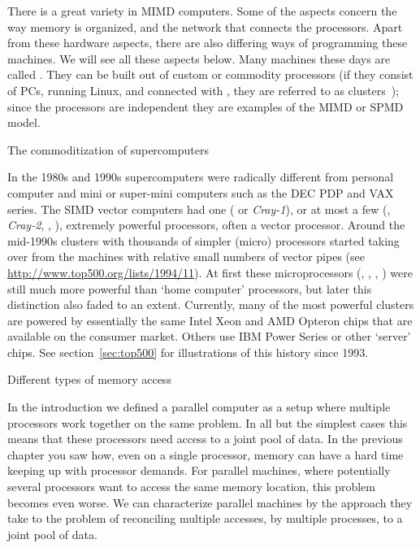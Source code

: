 There is a great variety in \ac{MIMD} computers. Some of the aspects
concern the way memory is organized, and the network that connects the
processors. Apart from these hardware aspects, there are also
differing ways of programming these machines. We will see all these
aspects below. Many machines these days are 
called . They can be built out of custom or
commodity processors (if they consist of PCs, running Linux, and
connected with , they are referred to as 
{clusters}~\cite{Gropp:BeowulfBook}); since the processors are
independent they are examples of the \ac{MIMD} or \ac{SPMD} model.


 {The commoditization of supercomputers}
\label{sec:commodity}

In the 1980s and 1990s supercomputers were radically different from
personal computer and mini or super-mini computers such as the DEC PDP
and VAX series. The SIMD vector computers had one
( or \emph{Cray-1}), or
at most a few (, \emph{Cray-2},
, ), extremely
powerful processors, often a vector processor. Around the mid-1990s
clusters with thousands of simpler (micro) processors started taking
over from the machines with relative small numbers of vector pipes
(see \url{http://www.top500.org/lists/1994/11}). At first these
microprocessors (,
, ,
) were still much more powerful than `home
computer' processors, but later this distinction also faded to an
extent. Currently, many of the most powerful clusters are powered by
essentially the same Intel Xeon and AMD Opteron chips that are
available on the consumer market. Others use IBM Power Series or other
`server' chips. See section~\ref{sec:top500} for illustrations of
this history since 1993.

 {Different types of memory access}

In the introduction we defined a parallel computer as a setup where
multiple processors work together on the same problem. In all but the
simplest cases this means that these processors need access to a joint
pool of data. In the previous chapter you saw how, even on a single
processor, memory can have a hard time keeping up with processor demands.
For parallel machines, where potentially several processors
want to access the same memory location, this problem becomes even
worse. We can characterize parallel machines by the approach they take
to the problem of reconciling multiple accesses, by multiple
processes, to a joint pool of data.

